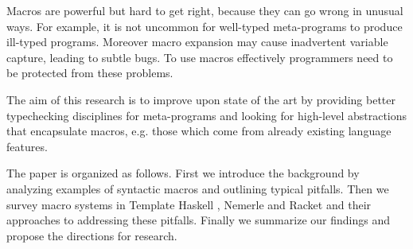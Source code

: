 \documentclass[10pt,journal,a4paper]{IEEEtran}
\begin{document}



Macros are powerful but hard to get right, because they can go wrong in unusual ways.
For example, it is not uncommon for well-typed meta-programs to produce ill-typed programs.
Moreover macro expansion may cause inadvertent variable capture, leading to
subtle bugs. To use macros effectively programmers need to be protected from these problems.

The aim of this research is to improve upon state of the art by providing better typechecking
disciplines for meta-programs and looking for high-level abstractions that encapsulate macros,
e.g. those which come from already existing language features.

The paper is organized as follows. First we introduce the background by analyzing examples
of syntactic macros and outlining typical pitfalls. Then we survey
macro systems in Template Haskell \cite{sheard02}, Nemerle \cite{skalski04} and Racket \cite{barzilay11}
and their approaches to addressing these pitfalls. Finally we summarize our findings
and propose the directions for research.
\end{document}

